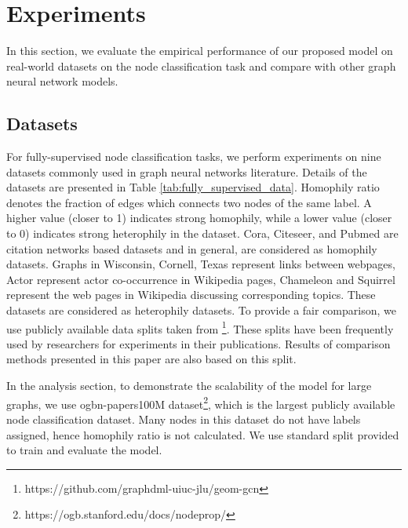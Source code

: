 \documentclass[sigconf,natbib=false]{acmart}
\begin{document}
\section{Experiments}
\label{experiments}
In this section, we evaluate the empirical performance of our proposed model on real-world datasets on the node classification task
and compare with other graph neural network models.

\subsection{Datasets}

For fully-supervised node classification tasks, we perform experiments on nine datasets commonly used in graph neural networks literature. Details of the datasets are presented in Table \ref{tab:fully_supervised_data}. Homophily ratio \cite{zhu_beyond_2020} denotes the fraction of edges which connects two nodes of the same label. A higher value (closer to 1) indicates strong homophily, while a lower value (closer to 0) indicates strong heterophily in the dataset. Cora, Citeseer, and Pubmed \cite{sen_collective_2008} are citation networks based datasets and in general, are considered as homophily datasets. Graphs in Wisconsin, Cornell, Texas \cite{pei_geom-gcn_2020} represent links between webpages, Actor \cite{tang_social_2009} represent actor co-occurrence in Wikipedia pages, Chameleon and Squirrel \cite{rozemberczki_multi-scale_2020} represent the web pages in Wikipedia discussing corresponding topics. These datasets are considered as heterophily datasets. To provide a fair comparison, we use publicly available data splits taken from \cite{pei_geom-gcn_2020}\footnote{https://github.com/graphdml-uiuc-jlu/geom-gcn}. These splits have been frequently used by researchers for experiments in their publications. Results of comparison methods presented in this paper are also based on this split.

In the analysis section, to demonstrate the scalability of the model for large graphs, we use ogbn-papers100M dataset\footnote{https://ogb.stanford.edu/docs/nodeprop/}, which is the largest publicly available node classification dataset. Many nodes in this dataset do not have labels assigned, hence homophily ratio is not calculated. We use standard split provided \cite{hu_open_2021} to train and evaluate the model. 
\end{document}
